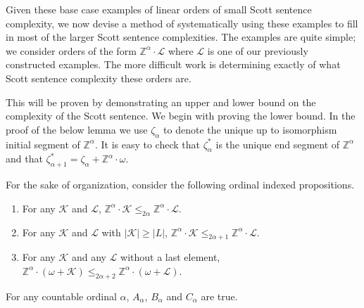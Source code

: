 \documentclass{amsart}
\newcommand{\Z}{\mathbb{Z}}
\newcommand{\K}{\mathcal{K}}
\renewcommand{\L}{\mathcal{L}}
\begin{document}
Given these base case examples of linear orders of small Scott sentence complexity, we now devise a method of systematically using these examples to fill in most of the larger Scott sentence complexities. 
The examples are quite simple; we consider orders of the form $\Z^\alpha\cdot
\L$ where $\L$ is one of our previously constructed examples. 
The more difficult work is determining exactly of what Scott sentence complexity these orders are. 
 
This will be proven by demonstrating an upper and lower bound on the complexity of the Scott sentence. 
We begin with proving the lower bound. 
In the proof of the below lemma we use $\zeta_\alpha$ to denote the unique up to
isomorphism initial segment of $\Z^\alpha$. 
It is easy to check that $\zeta_\alpha^*$ is the unique end segment of  $\Z^\alpha$ and that $\zeta_{\alpha+1}^*=\zeta_\alpha+\Z^\alpha\cdot\omega$. 

\begin{lemma}\label{lem:timesZ}
For the sake of organization, consider the following ordinal indexed propositions.
\begin{enumerate}\tightlist
\item[($A_\alpha$)] For any $\K$ and $\L$, $\Z^\alpha\cdot \K
    \leq_{2\alpha}\Z^\alpha\cdot \L$.
\item[($B_\alpha$)] For any $\K$ and $\L$ with $|\K|\geq|L|$, $\Z^\alpha\cdot \K
    \leq_{2\alpha+1}\Z^\alpha\cdot \L$.
\item[($C_\alpha$)] For any $\K$ and any $\L$ without a last element,
    $\Z^\alpha\cdot(\omega+\K)\leq_{2\alpha+2} \Z^\alpha\cdot(\omega+\L)$.
\end{enumerate}
For any countable ordinal $\alpha$, $A_\alpha$, $B_\alpha$ and $C_\alpha$ are true.
\end{lemma}
\end{document}
